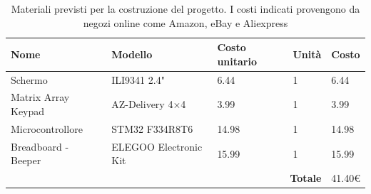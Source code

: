 \documentclass[a4paper]{article}
\begin{document}
\begin{center}
\begin{table}[h]
    \centering
    \begin{tabular}{|llll|l|}
        \hline
        \multicolumn{1}{|l|}{\textbf{Nome}}          & \multicolumn{1}{l|}{\textbf{Modello}}         & \multicolumn{1}{l|}{\textbf{Costo unitario}}  & \textbf{Unità}  & \textbf{Costo} \\ \hline
        \multicolumn{1}{|l|}{Schermo}                & \multicolumn{1}{l|}{ILI9341 2.4"}             & \multicolumn{1}{l|}{6.44}                     & 1               & 6.44          \\ \hline
        \multicolumn{1}{|l|}{Matrix Array Keypad}    & \multicolumn{1}{l|}{AZ-Delivery 4$\times$4}   & \multicolumn{1}{l|}{3.99}                     & 1               & 3.99          \\ \hline
        \multicolumn{1}{|l|}{Microcontrollore} & \multicolumn{1}{l|}{STM32 F334R8T6}    & \multicolumn{1}{l|}{14.98}                     & 1              & 14.98          \\ \hline
        \multicolumn{1}{|l|}{Breadboard - Beeper}     & \multicolumn{1}{l|}{ELEGOO Electronic Kit}       & \multicolumn{1}{l|}{15.99}                     & 1              & 15.99          \\ \hline
        \multicolumn{4}{|r|}{\textbf{Totale}}                                                                                                            & 41.40€         \\ \hline
    \end{tabular}
    \caption{
        Materiali previsti per la costruzione del progetto. I costi indicati
        provengono da negozi online come Amazon, eBay e Aliexpress
    }
\end{table}
\end{center}
\end{document}
